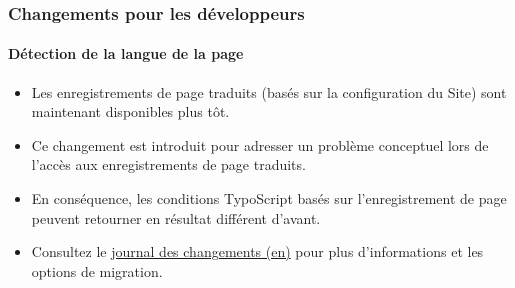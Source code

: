 %

\begin{frame}[fragile]
	\frametitle{Changements pour les développeurs}
	\framesubtitle{Détection de la langue de la page}


	\begin{itemize}
		\item Les enregistrements de page traduits (basés sur la configuration du Site)
			sont maintenant disponibles plus tôt.
		\item Ce changement est introduit pour adresser un problème conceptuel lors de
			l'accès aux enregistrements de page traduits.
		\item En conséquence, les conditions TypoScript basés sur l'enregistrement de page
			peuvent retourner en résultat différent d'avant.
		\item Consultez le \href{https://docs.typo3.org/c/typo3/cms-core/master/en-us/Changelog/11.0/Breaking-23736-PageLanguageDetectionSetEarlierInFrontendRequestProcess.html}{journal des changements (en)}
			pour plus d'informations et les options de migration.
	\end{itemize}

\end{frame}

